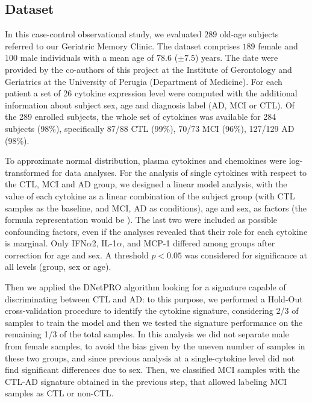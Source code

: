 \documentclass{standalone}
\begin{document}
\subsection[Dataset]{Dataset}\label{cytokine:cytokine_data}

In this case-control observational study, we evaluated $289$ old-age subjects referred to our Geriatric Memory Clinic.
The dataset comprises $189$ female and $100$ male individuals with a mean age of $78.6$ ($\pm7.5$) years.
The date were provided by the co-authors of this project at the Institute of Gerontology and Geriatrics at the University of Perugia (Department of Medicine).
For each patient a set of 26 cytokine expression level were computed with the additional information about subject sex, age and diagnosis label (AD, MCI or CTL).
Of the 289 enrolled subjects, the whole set of cytokines was available for 284 subjects (98\%), specifically 87/88 CTL (99\%), 70/73 MCI (96\%), 127/129 AD (98\%).

To approximate normal distribution, plasma cytokines and chemokines were log-transformed for data analyses.
For the analysis of single cytokines with respect to the CTL, MCI and AD group, we designed a linear model analysis, with the value of each cytokine as a linear combination of the subject group (with CTL samples as the baseline, and MCI, AD as conditions), age and sex, as factors (the formula representation would be ).
The last two were included as possible confounding factors, even if the analyses revealed that their role for each cytokine is marginal.
Only IFN$\alpha$2, IL-1$\alpha$, and MCP-1 differed among groups after correction for age and sex.
A threshold $p<0.05$ was considered for significance at all levels (group, sex or age).

Then we applied the \textsf{DNetPRO} algorithm looking for a signature capable of discriminating between CTL and AD: to this purpose, we performed a Hold-Out cross-validation procedure to identify the cytokine signature, considering 2/3 of samples to train the model and then we tested the signature performance on the remaining 1/3 of the total samples.
In this analysis we did not separate male from female samples, to avoid the bias given by the uneven number of samples in these two groups, and since previous analysis at a single-cytokine level did not find significant differences due to sex.
Then, we classified MCI samples with the CTL-AD signature obtained in the previous step, that allowed labeling MCI samples as CTL or non-CTL.

\end{document}
